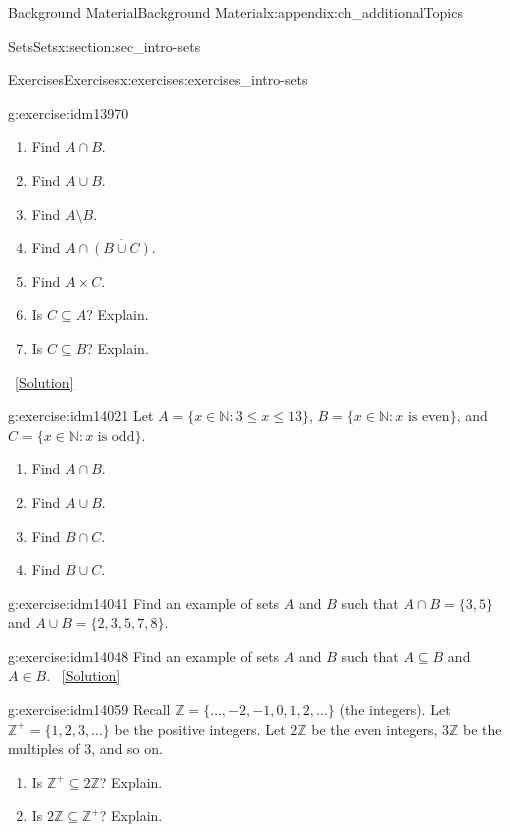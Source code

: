 \documentclass[oneside,10pt,]{book}
\numberwithin{equation}{chapter}
\def\N{\mathbb N}
\def\Z{\mathbb Z}
\def\st{:}
\begin{document}
\begin{appendixptx}{Background Material}{}{Background Material}{}{}{x:appendix:ch_additionalTopics}
\begin{sectionptx}{Sets}{}{Sets}{}{}{x:section:sec_intro-sets}
\begin{exercises-subsection}{Exercises}{}{Exercises}{}{}{x:exercises:exercises_intro-sets}
\begin{divisionexercise}{1}{}{}{g:exercise:idm13970}
\begin{enumerate}[label=(\alph*)]
\item{}Find \(A \cap B\).%
\item{}Find \(A \cup B\).%
\item{}Find \(A \setminus B\).%
\item{}Find \(A \cap \overline{(B \cup C)}\).%
\item{}Find \(A \times C\).%
\item{}Is \(C \subseteq A\)? Explain.%
\item{}Is \(C \subseteq B\)? Explain.%
\end{enumerate}
%
\qquad~\hfill{\tiny\hyperlink{g:solution:idm13999-main}{[Solution]}}\end{divisionexercise}%
\begin{divisionexercise}{2}{}{}{g:exercise:idm14021}%
Let \(A = \{x \in \N \st 3 \le x \le 13\}\), \(B = \{x \in \N \st x \mbox{ is even} \}\), and \(C = \{x \in \N \st x \mbox{ is odd} \}\).%
\par
%
\begin{enumerate}[label=(\alph*)]
\item{}Find \(A \cap B\).%
\item{}Find \(A \cup B\).%
\item{}Find \(B \cap C\).%
\item{}Find \(B \cup C\).%
\end{enumerate}
%
\end{divisionexercise}%
\begin{divisionexercise}{3}{}{}{g:exercise:idm14041}%
Find an example of sets \(A\) and \(B\) such that \(A\cap B = \{3, 5\}\) and \(A \cup B = \{2, 3, 5, 7, 8\}\).%
\end{divisionexercise}%
\begin{divisionexercise}{4}{}{}{g:exercise:idm14048}%
Find an example of sets \(A\) and \(B\) such that \(A \subseteq B\) and \(A \in B\).%
\qquad~\hfill{\tiny\hyperlink{g:solution:idm14055-main}{[Solution]}}\end{divisionexercise}%
\begin{divisionexercise}{5}{}{}{g:exercise:idm14059}%
Recall \(\Z = \{\ldots,-2,-1,0, 1,2,\ldots\}\) (the integers). Let \(\Z^+ = \{1, 2, 3, \ldots\}\) be the positive integers. Let \(2\Z\) be the even integers, \(3\Z\) be the multiples of 3, and so on.%
\par
%
\begin{enumerate}[label=(\alph*)]
\item{}Is \(\Z^+ \subseteq 2\Z\)? Explain.%
\item{}Is \(2\Z \subseteq \Z^+\)? Explain.%

\end{enumerate}
\end{divisionexercise}
\end{exercises-subsection}
\end{sectionptx}
\end{appendixptx}
\end{document}
